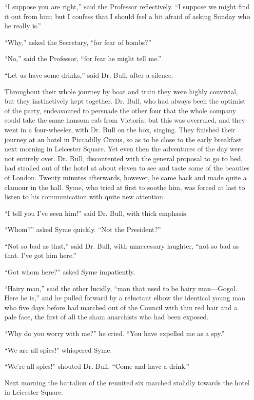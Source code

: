 “I suppose you are right,” said the Professor reflectively. “I suppose we might find it out from him; but I confess that I should feel a bit afraid of asking Sunday who he really is.”

“Why,” asked the Secretary, “for fear of bombs?”

“No,” said the Professor, “for fear he might tell me.”

“Let us have some drinks,” said Dr. Bull, after a silence.

Throughout their whole journey by boat and train they were highly convivial, but they instinctively kept together. Dr. Bull, who had always been the optimist of the party, endeavoured to persuade the other four that the whole company could take the same hansom cab from Victoria; but this was overruled, and they went in a four-wheeler, with Dr. Bull on the box, singing. They finished their journey at an hotel in Piccadilly Circus, so as to be close to the early breakfast next morning in Leicester Square. Yet even then the adventures of the day were not entirely over. Dr. Bull, discontented with the general proposal to go to bed, had strolled out of the hotel at about eleven to see and taste some of the beauties of London. Twenty minutes afterwards, however, he came back and made quite a clamour in the hall. Syme, who tried at first to soothe him, was forced at last to listen to his communication with quite new attention.

“I tell you I’ve seen him!” said Dr. Bull, with thick emphasis.

“Whom?” asked Syme quickly. “Not the President?”

“Not so bad as that,” said Dr. Bull, with unnecessary laughter, “not so bad as that. I’ve got him here.”

“Got whom here?” asked Syme impatiently.

“Hairy man,” said the other lucidly, “man that used to be hairy man⁠—Gogol. Here he is,” and he pulled forward by a reluctant elbow the identical young man who five days before had marched out of the Council with thin red hair and a pale face, the first of all the sham anarchists who had been exposed.

“Why do you worry with me?” he cried. “You have expelled me as a spy.”

“We are all spies!” whispered Syme.

“We’re all spies!” shouted Dr. Bull. “Come and have a drink.”

Next morning the battalion of the reunited six marched stolidly towards the hotel in Leicester Square.

